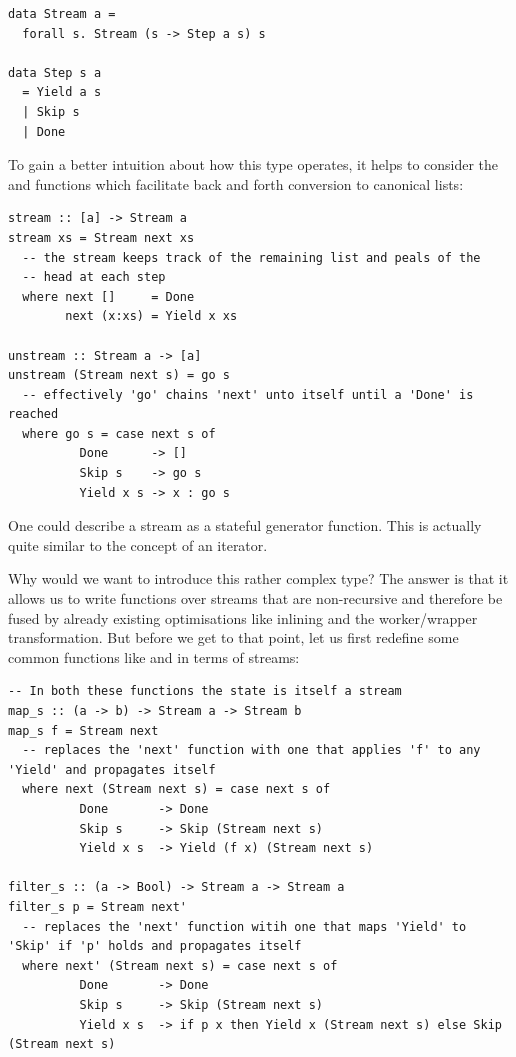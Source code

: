 \begin{listing}[H]
\begin{verbatim}
data Stream a = 
  forall s. Stream (s -> Step a s) s

data Step s a 
  = Yield a s 
  | Skip s 
  | Done
\end{verbatim}
\end{listing}

To gain a better intuition about how this type operates, it helps to consider the  and  functions which facilitate back and forth
conversion to canonical lists:

\begin{listing}[H]
\begin{verbatim}
stream :: [a] -> Stream a
stream xs = Stream next xs
  -- the stream keeps track of the remaining list and peals of the
  -- head at each step
  where next []     = Done
        next (x:xs) = Yield x xs

unstream :: Stream a -> [a]
unstream (Stream next s) = go s
  -- effectively 'go' chains 'next' unto itself until a 'Done' is reached
  where go s = case next s of
          Done      -> []
          Skip s    -> go s
          Yield x s -> x : go s
\end{verbatim}
\end{listing}

One could describe a stream as a stateful generator function. This is actually quite similar to the concept of an iterator.

Why would we want to introduce this rather complex type? The answer is that it allows us to write functions over streams that are
non-recursive and therefore be fused by already existing optimisations like inlining and the worker/wrapper transformation. But before
we get to that point, let us first redefine some common functions like  and  in terms of streams:

\begin{listing}[H]
\begin{verbatim}
-- In both these functions the state is itself a stream
map_s :: (a -> b) -> Stream a -> Stream b
map_s f = Stream next
  -- replaces the 'next' function with one that applies 'f' to any 'Yield' and propagates itself
  where next (Stream next s) = case next s of
          Done       -> Done
          Skip s     -> Skip (Stream next s)
          Yield x s  -> Yield (f x) (Stream next s)

filter_s :: (a -> Bool) -> Stream a -> Stream a
filter_s p = Stream next'
  -- replaces the 'next' function witih one that maps 'Yield' to 'Skip' if 'p' holds and propagates itself
  where next' (Stream next s) = case next s of
          Done       -> Done
          Skip s     -> Skip (Stream next s)
          Yield x s  -> if p x then Yield x (Stream next s) else Skip (Stream next s)
\end{verbatim}
\end{listing}

